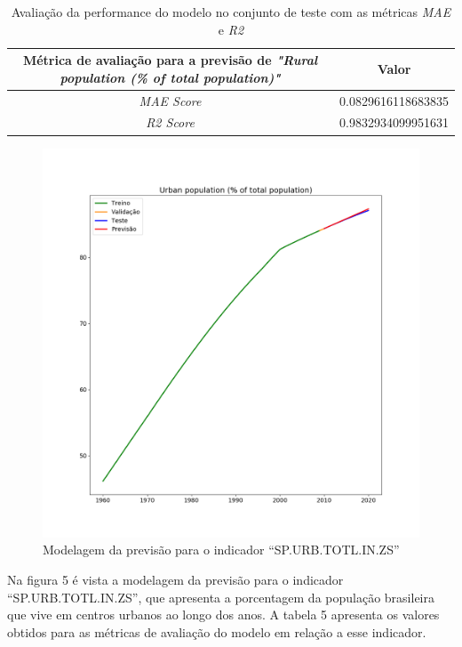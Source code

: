 \begin{table}[h!]
    \centering
    \begin{tabular}{|c|c|}
        \hline
        \multicolumn{1}{|p{5cm}|}{Métrica de avaliação para a previsão de \emph{"Rural population (\% of total population)"}} & Valor \\
        \hline
        \emph{MAE Score} & 0.0829616118683835 \\
        \hline
        \emph{R2 Score} & 0.9832934099951631 \\
        \hline 
    \end{tabular}
    \caption{Avaliação da performance do modelo no conjunto de teste com as métricas \emph{MAE} e \emph{R2}}
\end{table}

\begin{figure}[h!]
    \centering
    \includegraphics[scale=0.35]{images/Figure_3}
    \caption{Modelagem da previsão para o indicador “SP.URB.TOTL.IN.ZS”}
\end{figure}

Na figura 5 é vista a modelagem da previsão para o indicador ``SP.URB.TOTL.IN.ZS'', que apresenta a porcentagem 
da população brasileira que vive em centros urbanos ao longo dos anos. A tabela 5 apresenta os valores 
obtidos para as métricas de avaliação do modelo em relação a esse indicador. 

